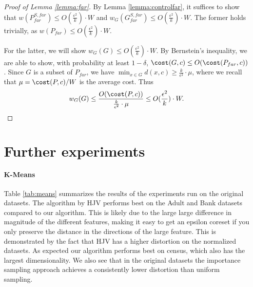 \begin{proof}[Proof of Lemma \ref{lemma:far}]
By Lemma \ref{lemma:controlfar}, it suffices to show that $w(P_{far}^{S,far})\leq O(\frac{\epsilon^2}{k})\cdot W$ and 
$w_G(G_{far}^{S,far})\leq O(\frac{\epsilon^2}{k})\cdot W$. The former holds trivially, as $w(P_{far})\leq O(\frac{\epsilon^2}{k})\cdot W$. 

For the latter, we will show $w_G(G)\leq O(\frac{\epsilon^2}{k})\cdot W$. By Bernstein's inequality, we are able to show, with probability at least $1-\delta$, $\cost(G,c)\leq O(\cost(P_{far},c))$. Since $G$ is a subset of $P_{far}$, we have  $\min_{x\in G} d(x,c)\geq \frac{k}{\epsilon^2}\cdot \mu$, where we recall that $\mu=\cost(P,c)/W$ is the average cost. Thus $$w_G(G)\leq \frac{O(\cost(P,c))}{\frac{k}{\epsilon^2}\cdot \mu}\leq  O(\frac{\epsilon^2}{k})\cdot W.$$
\end{proof}

\section{Further experiments}

\paragraph{K-Means}
Table \ref{tab:means} summarizes the results of the experiments run on the original datasets. The algorithm by HJV performs best on the Adult and Bank datasets compared to our algorithm. This is likely due to the large large difference in magnitude of the different features, making it easy to get an epsilon coreset if you only preserve the distance in the directions of the large feature. This is demonstrated by the fact that HJV has a higher distortion on the normalized datasets.
As expected our algorithm performs best on census, which also has the largest dimensionality. We also see that in the original datasets the importance sampling approach achieves a consistently lower distortion than uniform sampling.

